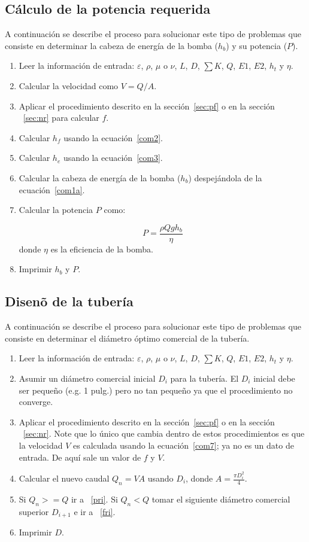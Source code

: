\documentclass[10pt, oneside]{article}
\begin{document}
\subsection{C\'alculo de la potencia requerida}\label{tubeSimplePoten}
A continuaci\'on se describe el proceso para solucionar este tipo de problemas que consiste en determinar la cabeza de energ\'ia de la bomba ($h_b$) y su potencia  ($P$).
\begin{enumerate} 
\item Leer la informaci\'on de entrada: $\varepsilon$, $\rho$, $\mu$ o $\nu$, $L$, $D$, $\sum K$, $Q$, $E1$, $E2$, $h_t$ y $\eta$.
\item Calcular la velocidad como $V=Q/A$.
\item Aplicar el procedimiento descrito en la secci\'on~\ref{sec:pf} o en la secci\'on ~\ref{sec:nr} para calcular $f$.
\item Calcular $h_f$ usando la ecuaci\'on~\ref{com2}.
\item Calcular $h_e$ usando la ecuaci\'on~\ref{com3}.
\item Calcular la cabeza de energ\'ia de la bomba ($h_b$) despej\'andola de la ecuaci\'on~\ref{com1a}.
\item Calcular la potencia $P$ como:

\begin{equation}
P = \frac{\rho Q g h_b}{\eta}
\label{com12a}
\end{equation}
donde $\eta$ es la eficiencia de la bomba.

\item Imprimir $h_b$ y $P$.
\end{enumerate} 

\subsection{Disen\~o de la  tuber\'ia}\label{tubeSimpleDesign}
A continuaci\'on se describe el proceso para solucionar este tipo de problemas que consiste en determinar el di\'ametro \'optimo comercial de la tuber\'ia.
\begin{enumerate} 
\item Leer la informaci\'on de entrada: $\varepsilon$, $\rho$, $\mu$ o $\nu$, $L$, $D$, $\sum K$, $Q$, $E1$, $E2$, $h_t$ y $\eta$.
\item Asumir un di\'ametro comercial inicial $D_i$ para la tuber\'ia. El $D_i$ inicial debe ser peque\~no (e.g. 1 pulg.) pero no tan peque\~no ya que el procedimiento no converge.
\item \label{fri} Aplicar el procedimiento descrito en la secci\'on~\ref{sec:pf} o en la secci\'on ~\ref{sec:nr}. Note que lo \'unico que cambia dentro de estos procedimientos es que la velocidad $V$ es calculada usando la ecuaci\'on~\ref{com7}; ya no es un dato de entrada. De aqu\'i sale un valor de $f$ y $V$.
\item Calcular el nuevo caudal $Q_n =VA$ usando $D_i$, donde $A=\frac{\pi D_i^2}{4}$.
\item Si $Q_n >= Q $ ir a ~\ref{pri}. Si $Q_n < Q$ tomar el siguiente di\'ametro comercial superior $D_{i+1}$ e ir a ~\ref{fri}.
\item \label{pri} Imprimir $D$.
\end{enumerate} 
\end{document}
